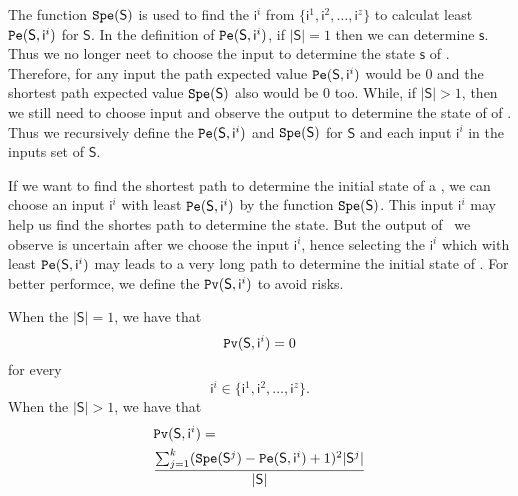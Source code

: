 The function ${\tt Spe}(\mathsf{S})$ is used to find the $\mathsf{ i}^{i}$ from $\{\mathsf{ i}^{1},\mathsf{ i}^{2},\ldots, \mathsf{ i}^{z}\}$ to calculat least ${\tt Pe}(\mathsf{S}, \mathsf{ i}^{i})$ for $\mathsf{S}$. In the definition of ${\tt Pe}(\mathsf{S}, \mathsf{ i}^{i})$, if $|\mathsf{S}|=1$ then we can determine $\mathsf{s}$. Thus we no longer neet to choose the input to determine the state $\mathsf{s}$ of \BCNs. Therefore, for any input the path expected value ${\tt Pe}(\mathsf{S}, \mathsf{ i}^{i})$ would be $0$ and the shortest path expected value ${\tt Spe}(\mathsf{S})$ also would be $0$ too. While, if $|\mathsf{S}|>1$, then we still need to choose input and observe the output to determine the state of of \BCNs. Thus we recursively define the ${\tt Pe}(\mathsf{S}, \mathsf{ i}^{i})$ and ${\tt Spe}(\mathsf{S})$ for $\mathsf{S}$ and each input $\mathsf{ i}^{i}$ in the inputs set of $\mathsf{S}$. 

If we want to find the shortest path to determine the initial state of a \BCN, we can choose an input $\mathsf{ i}^{i}$ with least ${\tt Pe}(\mathsf{S}, \mathsf{ i}^{i})$ by the function ${\tt Spe}(\mathsf{S})$. This input $\mathsf{ i}^{i}$ may help us find the shortes path to determine the state. But the output of \BCNs\ we observe is uncertain after we choose the input $\mathsf{ i}^{i}$, hence selecting the $\mathsf{ i}^{i}$ which with least ${\tt Pe}(\mathsf{S}, \mathsf{ i}^{i})$ may leads to a very long path to determine the initial state of \BCNs. For better performce, we define the ${\tt Pv}(\mathsf{S}, \mathsf{ i}^{i})$ to avoid risks.%
\begin{definition} 
When the $|\mathsf{S}|=1$, we have that
\[{\tt Pv}(\mathsf{S}, \mathsf{ i}^{i})=0\]  for every \[\mathsf{ i}^{i} \in \{\mathsf{ i}^{1},\mathsf{ i}^{2},\ldots, \mathsf{ i}^{z}\}.\]  When the $|\mathsf{S}|>1$, 
we have that\\ 
\begin{equation}
\begin{split}
&{\tt Pv}(\mathsf{S}, \mathsf{ i}^{i})=\\
&\frac{\sum_{j=1}^k ({\tt Spe}(\mathsf{S}^{j})-{\tt Pe}(\mathsf{S}, \mathsf{ i}^{i})+1)^2 |\mathsf{S}^{j}|}{ |\mathsf{S}|}
\end{split}
\end{equation}%
\end{definition}

